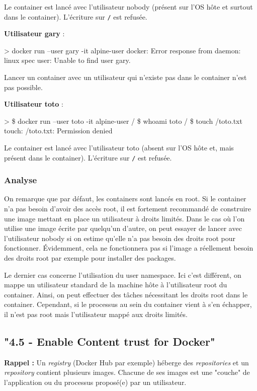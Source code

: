 \documentclass[11pt,a4paper,oneside]{report}
\newcommand{\code}[1]{\texttt{#1}}
\begin{document}
Le container est lancé avec l'utilisateur nobody (présent sur l'OS hôte et surtout dans le container). L'écriture sur \code{/} est refusée.


\textbf{Utilisateur gary} :
\begin{textcode}
> docker run --user gary -it alpine-user
docker: Error response from daemon: linux spec user: Unable to find user gary.
\end{textcode}

Lancer un container avec un utilisateur qui n'existe pas dans le container n'est pas possible.

\textbf{Utilisateur toto} :
\begin{textcode}
> \$ docker run --user toto -it alpine-user
/ \$ whoami
toto
/ \$ touch /toto.txt
touch: /toto.txt: Permission denied
\end{textcode}

Le container est lancé avec l'utilisateur toto (absent sur l'OS hôte et, mais présent dans le container). L'écriture sur \code{/} est refusée.

\subsubsection{Analyse}
On remarque que par défaut, les containers sont lancés en root. Si le container n'a pas besoin d'avoir des accès root, il est fortement recommandé de construire une image mettant en place un utilisateur à droits limités. Dans le cas où l'on utilise une image écrite par quelqu'un d'autre, on peut essayer de lancer avec l'utilisateur nobody si on estime qu'elle n'a pas besoin des droits root pour fonctionner. Évidemment, cela ne fonctionnera pas si l'image a réellement besoin des droits root par exemple pour installer des packages.

Le dernier cas concerne l'utilisation du user namespace. Ici c'est différent, on mappe un utilisateur standard de la machine hôte à l'utilisateur root du container. Ainsi, on peut effectuer des tâches nécessitant les droits root dans le container. Cependant, si le processus au sein du container vient à s'en échapper, il n'est pas root mais l'utilisateur mappé aux droits limités.


\subsection{"4.5  - Enable Content trust for Docker"}\label{ssc-content-trust}
\textbf{Rappel :} Un \textit{registry} (Docker Hub par exemple) héberge des \textit{repositories} et un \textit{repository} contient plusieurs images. Chacune de ses images est une "couche" de l'application ou du processus proposé(e) par un utilisateur.
\end{document}
